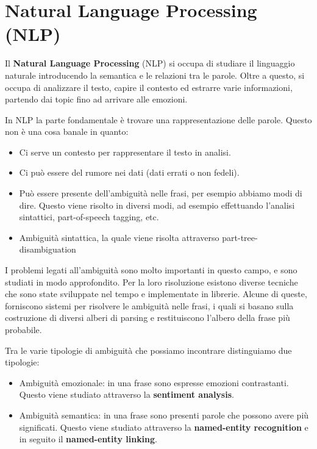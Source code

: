 \chapter{Natural Language Processing (NLP)}
Il \textbf{Natural Language Processing} (NLP) si occupa di studiare il linguaggio
naturale introducendo la semantica e le relazioni tra le parole. Oltre a questo,
si occupa di analizzare il testo, capire il contesto ed estrarre varie informazioni,
partendo dai topic fino ad arrivare alle emozioni.

In NLP la parte fondamentale è trovare una rappresentazione delle parole. Questo
non è una cosa banale in quanto:
\begin{itemize}
      \item Ci serve un contesto per rappresentare il testo in analisi.
      \item Ci può essere del rumore nei dati (dati errati o non fedeli).
      \item Può essere presente dell'ambiguità nelle frasi, per esempio abbiamo
            modi di dire. Questo viene risolto in diversi modi, ad esempio
            effettuando l'analisi sintattici, part-of-speech tagging, etc.
      \item Ambiguità sintattica, la quale viene risolta attraverso part-tree-disambiguation
\end{itemize}
I problemi legati all'ambiguità sono molto importanti in questo campo, e sono
studiati in modo approfondito. Per la loro risoluzione esistono diverse tecniche
che sono state sviluppate nel tempo e implementate in librerie.
Alcune di queste, forniscono sistemi per risolvere le ambiguità nelle frasi, i
quali si basano sulla costruzione di diversi alberi di parsing e restituiscono
l'albero della frase più probabile.

Tra le varie tipologie di ambiguità che possiamo incontrare distinguiamo due
tipologie:
\begin{itemize}
      \item Ambiguità emozionale: in una frase sono espresse emozioni contrastanti.
            Questo viene studiato attraverso la \textbf{sentiment analysis}.
      \item Ambiguità semantica: in una frase sono presenti parole che possono
            avere più significati. Questo viene studiato attraverso la
            \textbf{named-entity recognition} e in seguito il \textbf{named-entity
                  linking}.
\end{itemize}
